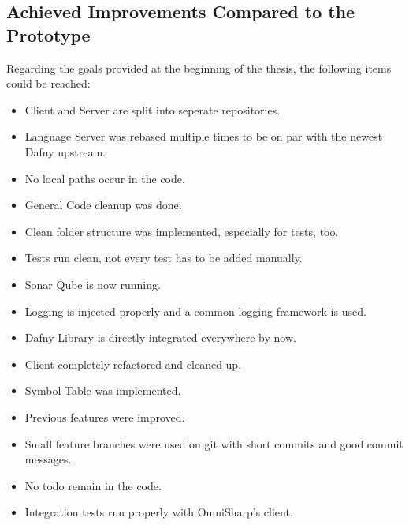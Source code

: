 \subsection{Achieved Improvements Compared to the Prototype}
Regarding the goals provided at the beginning of the thesis, the following items could be reached:
\begin{itemize}
    \item Client and Server are split into seperate repositories.
    \item Language Server was rebased multiple times to be on par with the newest Dafny upstream.
    \item No local paths occur in the code.
    \item General Code cleanup was done.
    \item Clean folder structure was implemented, especially for tests, too.
    \item Tests run clean, not every test has to be added manually.
    \item Sonar Qube is now running.
    \item Logging is injected properly and a common logging framework is used.
    \item Dafny Library is directly integrated everywhere by now.
    \item Client completely refactored and cleaned up.
    \item Symbol Table was implemented.
    \item Previous features were improved.
    \item Small feature branches were used on git with short commits and good commit messages.
    \item No todo remain in the code.
    \item Integration tests run properly with OmniSharp's client.
\end{itemize}
